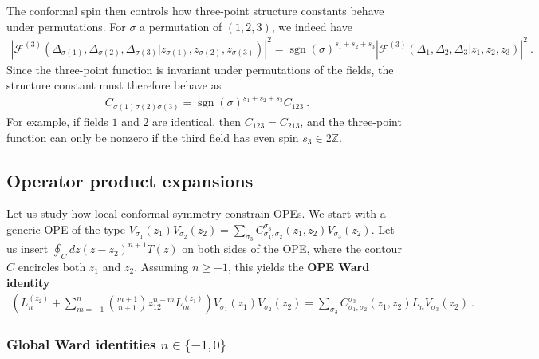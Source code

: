 \documentclass[12pt, a4paper, notitlepage, twoside]{report}
\numberwithin{equation}{section}
\theoremstyle{break}
\begin{document}
The conformal spin then controls how three-point structure constants behave under permutations. For $\sigma$ a permutation of $(1,2,3)$, we indeed have 
\begin{align}
 \left|\mathcal{F}^{(3)}(\Delta_{\sigma(1)},\Delta_{\sigma(2)},\Delta_{\sigma(3)}|z_{\sigma(1)},z_{\sigma(2)},z_{\sigma(3)})\right|^2 = \operatorname{sgn}(\sigma)^{s_1+s_2+s_3} \left|\mathcal{F}^{(3)}(\Delta_1,\Delta_2,\Delta_3|z_1,z_2,z_3)\right|^2\ .
\end{align}
Since the three-point function is invariant under permutations of the fields, the structure constant must therefore behave as 
\begin{align}
 \boxed{ C_{\sigma(1)\sigma(2)\sigma(3)} = \operatorname{sgn}(\sigma)^{s_1+s_2+s_3} C_{123} }\ .
 \label{css}
\end{align}
For example, if fields $1$ and $2$ are identical, then $C_{123}=C_{213}$, and the three-point function can only be nonzero if the third field has even spin $s_3\in 2\mathbb{Z}$.


\subsection{Operator product expansions \label{secope}}

Let us study how local conformal symmetry constrain OPEs. We start with a generic OPE of the type $V_{\sigma_1}(z_1)V_{\sigma_2}(z_2) = \sum_{\sigma_3} C_{\sigma_1,\sigma_2}^{\sigma_3}(z_1,z_2) V_{\sigma_3}(z_2)$. Let us insert $\oint_C dz (z-z_2)^{n+1} T(z)$ on both sides of the OPE, where the contour $C$ encircles both $z_1$ and $z_2$. Assuming $n\geq -1$, this yields the \textbf{OPE Ward identity}
\begin{align}
 \left(L_n^{(z_2)}+\sum_{m=-1}^{n}\binom{m+1}{n+1} z_{12}^{n-m}L_{m}^{(z_1)}\right)V_{\sigma_1}(z_1)V_{\sigma_2}(z_2) = \sum_{\sigma_3} C_{\sigma_1,\sigma_2}^{\sigma_3}(z_1,z_2) L_n V_{\sigma_3}(z_2)\ .
\end{align}

\subsubsection{Global Ward identities $n\in\{-1,0\}$}
\end{document}
